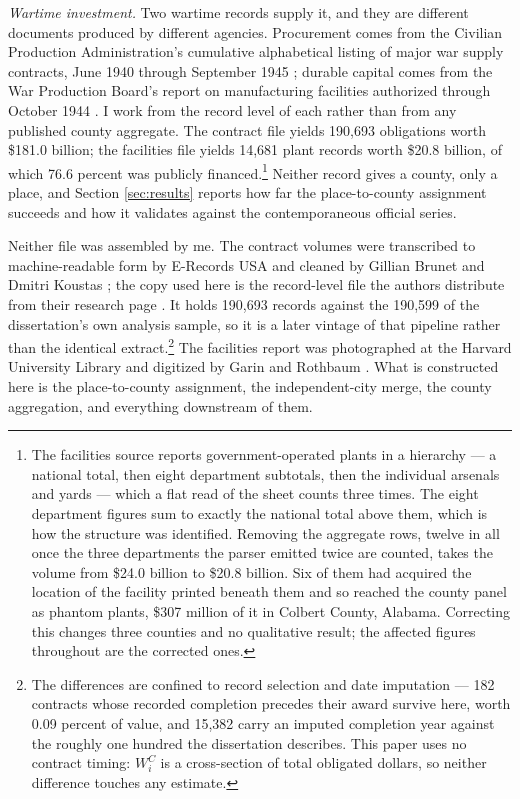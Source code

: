 \documentclass[12pt]{article}
\newcommand{\parencite}[1]{\citep{#1}}
\begin{document}
\noindent\emph{Wartime investment.} Two wartime records supply it, and they are
different documents produced by different agencies. Procurement comes from the
Civilian Production Administration's cumulative alphabetical listing of major
war supply contracts, June 1940 through September 1945 \parencite{cpaContracts1946};
durable capital comes from the War Production Board's report on manufacturing
facilities authorized through October 1944 \parencite{wpbFacilities1945}. I work
from the record level of each rather than from any published county aggregate.
The contract file yields 190{,}693 obligations worth \$181.0 billion; the
facilities file yields 14{,}681 plant records worth \$20.8 billion, of which 76.6
percent was publicly financed.\footnote{The facilities source reports government-operated
plants in a hierarchy --- a national total, then eight department subtotals, then
the individual arsenals and yards --- which a flat read of the sheet counts three
times. The eight department figures sum to exactly the national total above them,
which is how the structure was identified. Removing the aggregate rows, twelve in
all once the three departments the parser emitted twice are counted, takes the
volume from \$24.0 billion to \$20.8 billion. Six of them had acquired the
location of the facility printed beneath them and so reached the county panel as
phantom plants, \$307 million of it in Colbert County, Alabama. Correcting this
changes three counties and no qualitative result; the affected figures throughout
are the corrected ones.}
Neither record gives a county, only a place, and Section \ref{sec:results}
reports how far the place-to-county assignment succeeds and how it validates
against the contemporaneous official series.

\noindent Neither file was assembled by me. The contract volumes were transcribed
to machine-readable form by E-Records USA and cleaned by Gillian Brunet and
Dmitri Koustas \parencite{brunet2017}; the copy used here is the record-level file
the authors distribute from their research page \parencite{brunetContractData}. It
holds 190{,}693 records against the 190{,}599 of the dissertation's own analysis
sample, so it is a later vintage of that pipeline rather than the identical extract.\footnote{The
differences are confined to record selection and date imputation --- 182
contracts whose recorded completion precedes their award survive here, worth
0.09 percent of value, and 15{,}382 carry an imputed completion year against the
roughly one hundred the dissertation describes. This paper uses no contract
timing: $W_i^{C}$ is a cross-section of total obligated dollars, so neither
difference touches any estimate.} The facilities report was photographed at the
Harvard University Library and digitized by Garin and Rothbaum
\parencite{garin2025,wpbFacilities1945}. What is constructed here is the
place-to-county assignment, the independent-city merge, the county aggregation,
and everything downstream of them.
\end{document}
